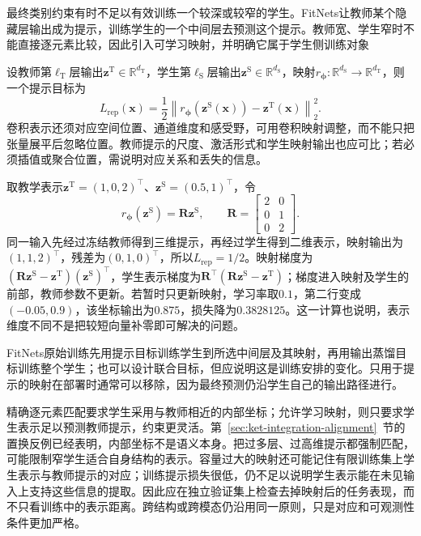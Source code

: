 最终类别约束有时不足以有效训练一个较深或较窄的学生。FitNets让教师某个隐藏层输出成为提示，训练学生的一个中间层去预测这个提示。教师宽、学生窄时不能直接逐元素比较，因此引入可学习映射，并明确它属于学生侧训练对象

设教师第$\ell_{\mathrm{T}}$层输出$\bm{z}^{\mathrm{T}}\in\mathbb{R}^{d_{\mathrm{T}}}$，学生第$\ell_{\mathrm{S}}$层输出$\bm{z}^{\mathrm{S}}\in\mathbb{R}^{d_{\mathrm{S}}}$，映射$r_{\bm{\phi}}:\mathbb{R}^{d_{\mathrm{S}}}\to\mathbb{R}^{d_{\mathrm{T}}}$，则一个提示目标为
\begin{equation}
  L_{\mathrm{rep}}(\bm{x})
   =\frac{1}{2}\left\|
      r_{\bm{\phi}}(\bm{z}^{\mathrm{S}}(\bm{x}))
        -\bm{z}^{\mathrm{T}}(\bm{x})
     \right\|_2^2.
  \label{eq:ket-integration-feature-loss}
\end{equation}
卷积表示还须对应空间位置、通道维度和感受野，可用卷积映射调整，而不能只把张量展平后忽略位置。教师提示的尺度、激活形式和学生映射输出也应可比；若必须插值或聚合位置，需说明对应关系和丢失的信息。

取教学表示$\bm{z}^{\mathrm{T}}=(1,0,2)^\top$、$\bm{z}^{\mathrm{S}}=(0.5,1)^\top$，令
\[
  r_{\bm{\phi}}(\bm{z}^{\mathrm{S}})=\bm{R}\bm{z}^{\mathrm{S}},
  \qquad
  \bm{R}=\begin{bmatrix}2&0\\0&1\\0&2\end{bmatrix}.
\]
同一输入先经过冻结教师得到三维提示，再经过学生得到二维表示，映射输出为$(1,1,2)^\top$，残差为$(0,1,0)^\top$，所以$L_{\mathrm{rep}}=1/2$。映射梯度为$(\bm{R}\bm{z}^{\mathrm{S}}-\bm{z}^{\mathrm{T}})(\bm{z}^{\mathrm{S}})^\top$，学生表示梯度为$\bm{R}^{\top}(\bm{R}\bm{z}^{\mathrm{S}}-\bm{z}^{\mathrm{T}})$；梯度进入映射及学生的前部，教师参数不更新。若暂时只更新映射，学习率取$0.1$，第二行变成$(-0.05,0.9)$，该坐标输出为$0.875$，损失降为$0.3828125$。这一计算也说明，表示维度不同不是把较短向量补零即可解决的问题。

FitNets原始训练先用提示目标训练学生到所选中间层及其映射，再用输出蒸馏目标训练整个学生；也可以设计联合目标，但应说明这是训练安排的变化。只用于提示的映射在部署时通常可以移除，因为最终预测仍沿学生自己的输出路径进行。

精确逐元素匹配要求学生采用与教师相近的内部坐标；允许学习映射，则只要求学生表示足以预测教师提示，约束更灵活。第~\ref{sec:ket-integration-alignment}~节的置换反例已经表明，内部坐标不是语义本身。把过多层、过高维提示都强制匹配，可能限制窄学生适合自身结构的表示。容量过大的映射还可能记住有限训练集上学生表示与教师提示的对应；训练提示损失很低，仍不足以说明学生表示能在未见输入上支持这些信息的提取。因此应在独立验证集上检查去掉映射后的任务表现，而不只看训练中的表示距离。跨结构或跨模态仍沿用同一原则，只是对应和可观测性条件更加严格。

